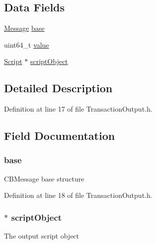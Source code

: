 \subsection*{Data Fields}
\begin{DoxyCompactItemize}
\item 
\hyperlink{struct_m_i_message}{Message} \hyperlink{struct_m_i_transaction_output_a487e4843cf1cf7397eb2e1bcf91cbf3b}{base}
\item 
uint64\_\-t \hyperlink{struct_m_i_transaction_output_a4e630859cc0e2a22bd6acf39a6a8e218}{value}
\item 
\hyperlink{struct_m_i_byte_array}{Script} $\ast$ \hyperlink{struct_m_i_transaction_output_ad2f125749a4bf410b647bc258de817d6}{scriptObject}
\end{DoxyCompactItemize}


\subsection{Detailed Description}


Definition at line 17 of file TransactionOutput.h.



\subsection{Field Documentation}
\hypertarget{struct_m_i_transaction_output_a487e4843cf1cf7397eb2e1bcf91cbf3b}{
\subsubsection[{base}]{ {\bf base}}}
\label{struct_m_i_transaction_output_a487e4843cf1cf7397eb2e1bcf91cbf3b}
CBMessage base structure 

Definition at line 18 of file TransactionOutput.h.

\hypertarget{struct_m_i_transaction_output_ad2f125749a4bf410b647bc258de817d6}{
\subsubsection[{scriptObject}]{$\ast$ {\bf scriptObject}}}
\label{struct_m_i_transaction_output_ad2f125749a4bf410b647bc258de817d6}
The output script object 

